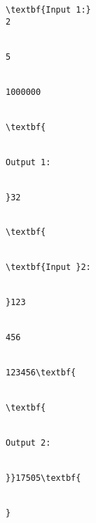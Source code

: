 \begin{verbatim}
\textbf{Input 1:}
2


5


1000000


\textbf{


Output 1:


}32


\textbf{


\textbf{Input }2:


}123


456


123456\textbf{


\textbf{


Output 2:


}}17505\textbf{


}\end{verbatim}